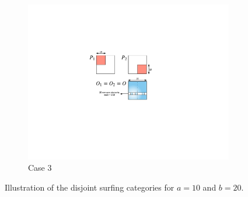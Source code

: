 \begin{figure}
		\begin{subfigure}[b]{0.15\textwidth}
			\includegraphics[width=\textwidth]{./img/case3-2}
			\caption{Case 3}
			\label{fig:case3}
		\end{subfigure}
		\caption{Illustration of the disjoint surfing categories for $a = 10$ and $b = 20$.}\label{fig:dsurf}
	\end{figure}
	
